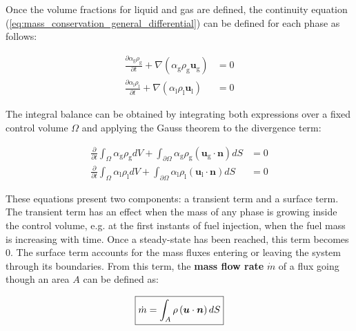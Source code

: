 Once the volume fractions for liquid and gas are defined, the continuity equation (\ref{eq:mass_conservation_general_differential}) can be defined for each phase as follows:

\begin{subequations}
\begin{align}
\frac{\partial \alpha_\mathrm{g} \rho_\mathrm{g} }{\partial t} + \nabla \left( \alpha_\mathrm{g} \rho_\mathrm{g} \boldsymbol{u}_\mathrm{g} \right) &= 0  \\
\frac{\partial \alpha_\mathrm{l} \rho_\mathrm{l} }{\partial t} + \nabla \left( \alpha_\mathrm{l} \rho_\mathrm{l} \boldsymbol{u}_\mathrm{l} \right) &= 0
\end{align}
\end{subequations}

The integral balance can be obtained by integrating both expressions over a fixed control volume $\Omega$ and applying the Gauss theorem to the divergence term:

\begin{subequations}
\label{eq:mass_conservation_general_bothPhases_showingIntegrals}
\begin{align}
\frac{\partial}{\partial t} \int_{\Omega} \alpha_\mathrm{g} \rho_\mathrm{g} dV + \int_{\partial {\Omega}} \alpha_\mathrm{g} \rho_\mathrm{g} \left( \boldsymbol{u}_\mathrm{g} \cdot \boldsymbol{n} \right) dS &= 0  \\
\frac{\partial}{\partial t} \int_{\Omega} \alpha_\mathrm{l} \rho_\mathrm{l} dV + \int_{\partial {\Omega}} \alpha_\mathrm{l} \rho_\mathrm{l} \left( \boldsymbol{u}_\mathrm{l} \cdot \boldsymbol{n} \right) dS &= 0 
\end{align}
\end{subequations}

These equations present two components: a transient term and a surface term. The transient term has an effect when the mass of any phase is growing inside the control volume, e.g. at the first instants of fuel injection, when the fuel mass is increasing with time. Once a steady-state has been reached, this term becomes $0$. The surface term accounts for the mass fluxes entering or leaving the system through its boundaries. From this term, the \textbf{mass flow rate} $\dot{m}$ of a flux going though an area $A$ can be defined as:

\begin{equation}
\boxed{
\label{eq:mass_flow_rate_definition_general}
\dot{m} = \int_A \rho \left( \boldsymbol{u} \cdot \boldsymbol{n} \right) dS
}
\end{equation}

